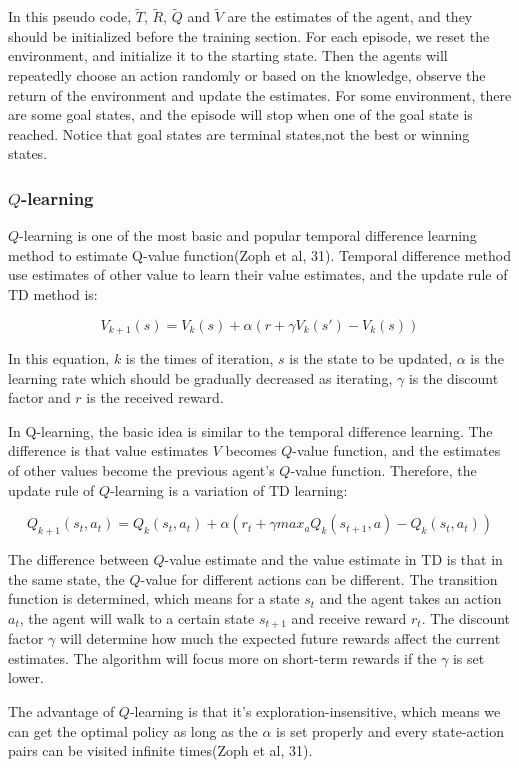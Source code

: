 \documentclass[14pt]{extarticle}
\begin{document}
In this pseudo code, $\tilde{T}$, $\tilde{R}$, $\tilde{Q}$ and $\tilde{V}$ are the estimates of the agent, and they should be initialized before the training section. For each episode, we reset the environment, and initialize it to the starting state. Then the agents will repeatedly choose an action randomly or based on the knowledge, observe the return of the environment and update the estimates. For some environment, there are some goal states, and the episode will stop when one of the goal state is reached. Notice that goal states are terminal states,not the best or winning states.

\subsubsection{$Q$-learning}

$Q$-learning is one of the most basic and popular temporal difference learning method to estimate Q-value function(Zoph et al, 31). Temporal difference method use estimates of other value to learn their value estimates, and the update rule of TD method is: 

$$V_{k+1}(s) = V_{k}(s) + \alpha(r + \gamma V_k(s') - V_k(s))$$ 

In this equation, $k$ is the times of iteration, $s$ is the state to be updated, $\alpha$ is the learning rate which should be gradually decreased as iterating, $\gamma$ is the discount factor and $r$ is the received reward.

In Q-learning, the basic idea is similar to the temporal difference learning. The difference is that value estimates $V$ becomes $Q$-value function, and the estimates of other values become the previous agent's $Q$-value function. Therefore, the update rule of $Q$-learning is a variation of TD learning:

$$Q_{k+1}(s_t, a_t) = Q_{k}(s_t, a_t) + \alpha(r_t + \gamma max_{a}Q_k(s_{t+1},a) - Q_k(s_t, a_t))$$

The difference between $Q$-value estimate and the value estimate in TD is that in the same state, the $Q$-value for different actions can be different. The transition function is determined, which means for a state $s_t$ and the agent takes an action $a_t$, the agent will walk to a certain state $s_{t+1}$ and receive reward $r_t$. The discount factor $\gamma$ will determine how much the expected future rewards affect the current estimates. The algorithm will focus more on short-term rewards if the $\gamma$ is set lower. 

The advantage of $Q$-learning is that it's exploration-insensitive, which means we can get the optimal policy as long as the $\alpha$ is set properly and every state-action pairs can be visited infinite times(Zoph et al, 31).
\end{document}
